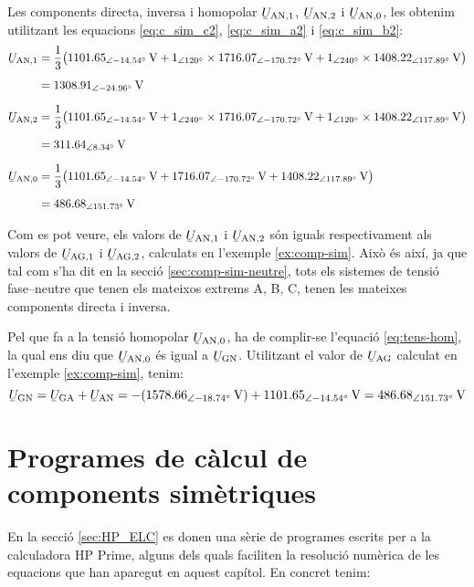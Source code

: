 \begin{exemple}
    Les components directa, inversa i homopolar $\cmplx{U}\ped{AN,1}$, $\cmplx{U}\ped{AN,2}$ i
    $\cmplx{U}\ped{AN,0}$, les obtenim utilitzant les equacions
    \eqref{eq:c_sim_c2}, \eqref{eq:c_sim_a2} i \eqref{eq:c_sim_b2}:
    \begin{align*}
        \cmplx{U}\ped{AN,1} &= \frac{1}{3} \big(
        \qtypd{1101,65}{-14,54}{V} + \numpd{1}{120} \times \qtypd{1716,07}{-170,72}{V} +
        \numpd{1}{240} \times \qtypd{1408,22}{117,89}{V} \big) \\[1ex]
        &= \qtypd{1308,91}{-24,96}{V} \\[1.5ex]
        \cmplx{U}\ped{AN,2} &= \frac{1}{3} \big(
        \qtypd{1101,65}{-14,54}{V} + \numpd{1}{240} \times \qtypd{1716,07}{-170,72}{V} +
        \numpd{1}{120} \times \qtypd{1408,22}{117,89}{V} \big) \\[1ex]
        &= \qtypd{311,64}{8,34}{V} \\[1.5ex]
        \cmplx{U}\ped{AN,0} &= \frac{1}{3} \big(
        \qtypd{1101,65}{-14,54}{V} + \qtypd{1716,07}{-170,72}{V} + \qtypd{1408,22}{117,89}{V} \big)  \\[1ex]
        &= \qtypd{486,68}{151,73}{V}
    \end{align*}

    Com es pot veure, els valors de $\cmplx{U}\ped{AN,1}$ i $\cmplx{U}\ped{AN,2}$ són iguals respectivament als valors de $\cmplx{U}\ped{AG,1}$ i $\cmplx{U}\ped{AG,2}$, calculats en l'exemple \ref{ex:comp-sim}.
    Això és així, ja que tal com s'ha dit en la secció \vref{sec:comp-sim-neutre}, tots els sistemes de tensió fase–neutre que tenen els mateixos extrems A, B, C, tenen les mateixes components directa i inversa.

    Pel que fa a la tensió homopolar $\cmplx{U}\ped{AN,0}$, ha de complir-se l'equació \eqref{eq:tens-hom}, la qual ens diu que $\cmplx{U}\ped{AN,0}$ és igual a $\cmplx{U}\ped{GN}$. Utilitzant el valor de  $\cmplx{U}\ped{AG}$ calculat en l'exemple \ref{ex:comp-sim}, tenim:
    \[
        \cmplx{U}\ped{GN} = \cmplx{U}\ped{GA} + \cmplx{U}\ped{AN} = -(\qtypd{1578,66}{-18,74}{V}) +
        \qtypd{1101,65}{-14,54}{V} = \qtypd{486,68}{151,73}{V}
    \]
\end{exemple}

\section{Programes de càlcul de components simètriques}\label{sec:calcul-comp-sim}

En la secció \vref{sec:HP_ELC} es donen  una sèrie de programes escrits per a la calculadora \textsf{HP Prime},
 alguns dels quals faciliten la resolució numèrica de les equacions que han aparegut en aquest capítol. En concret tenim:

